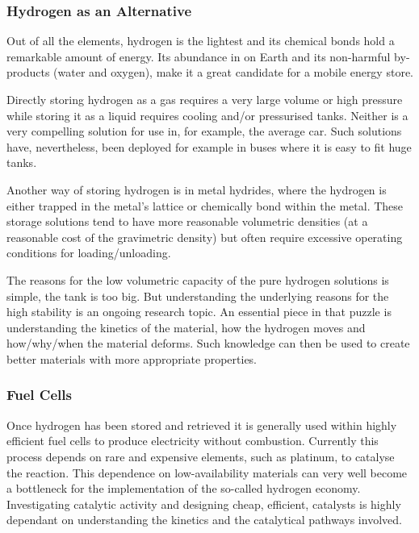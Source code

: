 \subsubsection{Hydrogen as an Alternative}
Out of all the elements, hydrogen is the lightest and its chemical bonds hold a remarkable amount of energy.
Its abundance in on Earth and its non-harmful by-products (water and oxygen), make it a great candidate for a mobile energy store.

Directly storing hydrogen as a gas requires a very large volume or high pressure while storing it as a liquid requires cooling and/or pressurised tanks.
Neither is a very compelling solution for use in, for example, the average car.
Such solutions have, nevertheless, been deployed for example in buses where it is easy to fit huge tanks. %

Another way of storing hydrogen is in metal hydrides, where the hydrogen is either trapped in the metal's lattice or chemically bond within the metal.
These storage solutions tend to have more reasonable volumetric densities (at a reasonable cost of the gravimetric density) but often require excessive operating conditions for loading/unloading.~\cite{borohydride-stability-2006}

The reasons for the low volumetric capacity of the pure hydrogen solutions is simple, the tank is too big.
But understanding the underlying reasons for the high stability is an ongoing research topic.
An essential piece in that puzzle is understanding the kinetics of the material, how the hydrogen moves and how/why/when the material deforms.
Such knowledge can then be used to create better materials with more appropriate properties.

\subsubsection{Fuel Cells}
Once hydrogen has been stored and retrieved it is generally used within highly efficient fuel cells to produce electricity without combustion. %
Currently this process depends on rare and expensive elements, such as platinum, to catalyse the reaction.
This dependence on low-availability materials can very well become a bottleneck for the implementation of the so-called hydrogen economy.
Investigating catalytic activity and designing cheap, efficient, catalysts is highly dependant on understanding the kinetics and the catalytical pathways involved.


